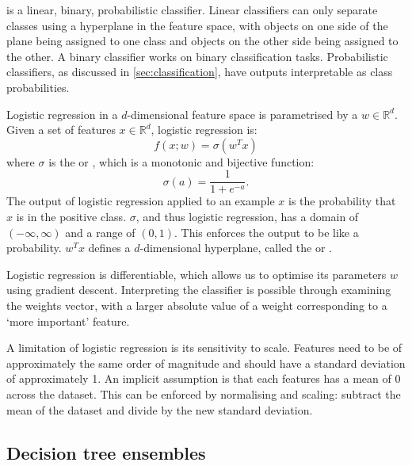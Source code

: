          is a linear, binary, probabilistic classifier. Linear classifiers can only separate classes using a hyperplane in the feature space, with objects on one side of the plane being assigned to one class and objects on the other side being assigned to the other. A binary classifier works on binary classification tasks. Probabilistic classifiers, as discussed in \autoref{sec:classification}, have outputs interpretable as class probabilities.

        Logistic regression in a $d$-dimensional feature space is parametrised by a  $w \in \mathbb R^d$. Given a set of features $x \in \mathbb R^d$, logistic regression is:
        \begin{equation}
            \label{eq:logistic-regression}
            f(x; w) = \sigma(w^T x)
        \end{equation}
        where $\sigma$ is the  or , which is a monotonic and bijective function:
        \begin{equation}
            \label{eq:logistic-function}
            \sigma(a) = \frac{1}{1 + e^{-a}}.
        \end{equation}
        The output of logistic regression applied to an example $x$ is the probability that $x$ is in the positive class. $\sigma$, and thus logistic regression, has a domain of $(-\infty, \infty)$ and a range of $(0, 1)$. This enforces the output to be like a probability. $w^T x$ defines a $d$-dimensional hyperplane, called the  or .

        Logistic regression is differentiable, which allows us to optimise its parameters $w$ using gradient descent. Interpreting the classifier is possible through examining the weights vector, with a larger absolute value of a weight corresponding to a `more important' feature.

        A limitation of logistic regression is its sensitivity to scale. Features need to be of approximately the same order of magnitude and should have a standard deviation of approximately 1. An implicit assumption is that each features has a mean of 0 across the dataset. This can be enforced by normalising and scaling: subtract the mean of the dataset and divide by the new standard deviation.


    \subsection{Decision tree ensembles}
    \label{sec:decision-trees}

